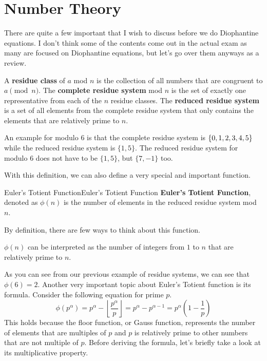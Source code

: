 \documentclass[../../main.tex]{subfiles}
\begin{document}
\section{Number Theory}

There are quite a few important that I wish to discuss before
we do Diophantine equations. I don't think some of the contents
come out in the actual exam as many are focused on Diophantine
equations, but let's go over them anyways as a review.

\begin{definition}{}{}
A \textbf{residue class} of $a$ mod $n$ is the collection of
all numbers that are congruent to $a \pmod{n}$.
The \textbf{complete residue system} mod $n$ is the set of
exactly one representative from each of the $n$ residue classes.
The \textbf{reduced residue system} is a set of all elements
from the complete residue system that only contains the elements
that are relatively prime to $n$.
\end{definition}

An example for modulo $6$ is that the complete residue system
is $\{ 0, 1, 2, 3, \linebreak 4, 5 \}$ while the reduced residue
system is $\{ 1, 5 \}$. The reduced residue system for modulo $6$
does not have to be $\{ 1, 5 \}$, but $\{ 7, -1 \}$ too.

With this definition, we can also define a very special and
important function.

\begin{definition}{Euler's Totient Function}{Euler's Totient Function}
\textbf{Euler's Totient Function}, denoted as $\phi(n)$ is
the number of elements in the reduced residue system mod $n$.
\end{definition}

By definition, there are few ways to think about this function.

\begin{important}
$\phi(n)$ can be interpreted as the number of integers from
$1$ to $n$ that are relatively prime to $n$.
\end{important}

As you can see from our previous example of residue systems,
we can see that $\phi(6) = 2$. Another very important topic about
Euler's Totient function is its formula. Consider the following
equation for prime $p$.
\[
\phi\left( p^\alpha \right)
= p^\alpha - \left\lfloor \frac{p^\alpha}{p} \right\rfloor
= p^\alpha - p^{\alpha - 1}
= p^\alpha \left( 1 - \frac{1}{p} \right)
\]
This holds because the floor function, or Gauss function,
represents the number of elements that are multiples of $p$ and
$p$ is relatively prime to other numbers that are not multiple
of $p$. Before deriving the formula, let's briefly take a look
at its multiplicative property.
\end{document}
